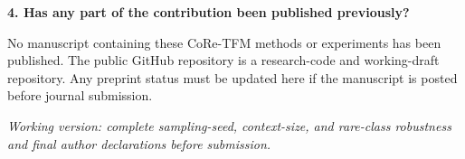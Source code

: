 \documentclass[11pt]{article}
\begin{document}
\textbf{4. Has any part of the contribution been published previously?}

No manuscript containing these CoRe-TFM methods or experiments has been published. The public GitHub repository is a research-code and working-draft repository. Any preprint status must be updated here if the manuscript is posted before journal submission.

\vfill
\textit{Working version: complete sampling-seed, context-size, and rare-class robustness and final author declarations before submission.}
\end{document}
